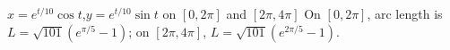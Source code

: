 {$x=e^{t/10}\cos t$,\quad  $y=e^{t/10}\sin t$ on $[0,2\pi]$ and $[2\pi,4\pi]$}
{On $[0,2\pi]$, arc length is $L = \sqrt{101}(e^{\pi/5}-1)$; on $[2\pi,4\pi]$, $L =\sqrt{101}(e^{2\pi/5}-1)$. }
